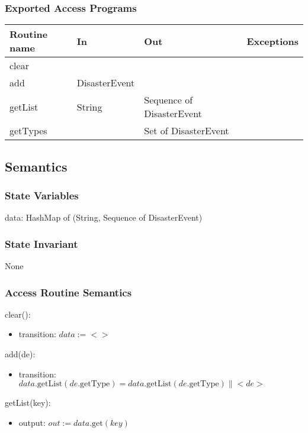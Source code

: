 \documentclass[12pt]{article}
\begin{document}
\subsubsection* {Exported Access Programs}

\begin{tabular}{| l | l | l | l |}
\hline
\textbf{Routine name} & \textbf{In} & \textbf{Out} & \textbf{Exceptions}\\
\hline
clear & ~ & ~ & ~ \\
\hline
add & DisasterEvent & ~ & ~ \\
\hline
getList & String & Sequence of DisasterEvent & ~ \\
\hline
getTypes & ~ & Set of DisasterEvent & ~ \\
\hline
\end{tabular}

\subsection* {Semantics}

\subsubsection* {State Variables}

data: HashMap of (String, Sequence of DisasterEvent)

\subsubsection* {State Invariant}

None

\newpage
\subsubsection* {Access Routine Semantics}

clear():
\begin{itemize}
\item transition: $data := <>$
\end{itemize}

\noindent add(de):
\begin{itemize}
\item transition: $data.\mbox{getList}(de.\mbox{getType}) = data.\mbox{getList}(de.\mbox{getType}) \| <de>$
\end{itemize}

\noindent getList(key):
\begin{itemize}
\item output: $out := data.\mbox{get}(key)$
\end{itemize}
\end{document}
